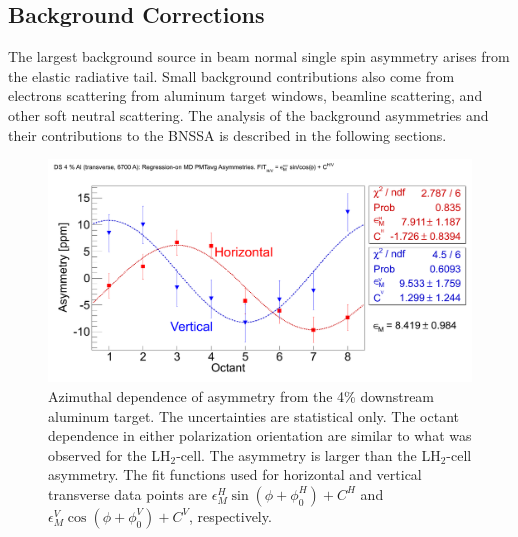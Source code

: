 


\subsection{Background Corrections}
\label{Background Corrections}

The largest background source in beam normal single spin asymmetry arises from the elastic radiative tail. Small background contributions also come from electrons scattering from aluminum target windows, beamline scattering, and other soft neutral scattering. The analysis of the background asymmetries and their contributions to the BNSSA is described in the following sections.


\begin{figure}[!h]
	\begin{center}
	\includegraphics[width=15.0cm]{figures/asymmetry_Al}
	\end{center}
	\caption
	{Azimuthal dependence of asymmetry from the 4\% downstream aluminum target. The uncertainties are statistical only. The octant dependence in either polarization orientation are similar to what was observed for the LH$_{2}$-cell. The asymmetry is larger than the LH$_{2}$-cell asymmetry. The fit functions used for horizontal and vertical transverse data points are $\epsilon_{M}^{H}\sin(\phi+\phi_{0}^{H}) + C^{H}$ and $\epsilon_{M}^{V}\cos(\phi+\phi_{0}^{V}) + C^{V}$, respectively.}
	\label{fig:asymmetry_Al}
\end{figure}

